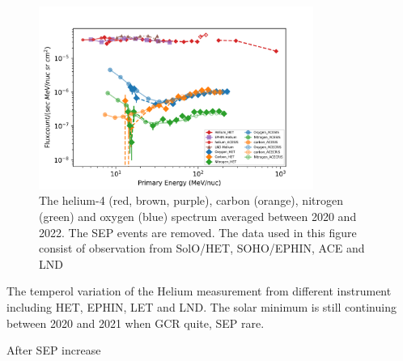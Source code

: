 \begin{figure}
    \centering
    \includegraphics[width = 0.8\textwidth]{images/ACR/ACE_SIS_CRIS_SOLO_all_3.png}
    \caption[The quite time spactra of helium, carbon, nitrogen and oxygen between 2020 and 2022]{The helium-4 (red, brown, purple), carbon (orange), nitrogen (green) and oxygen (blue) spectrum averaged between 2020 and 2022. The \ac{SEP} events are removed. The data used in this figure consist of observation from \ac{SolO}/\ac{HET}, \ac{SOHO}/\ac{EPHIN}, \ac{ACE} and \ac{LND}}
    \label{fig:overview}
\end{figure}




The temperol variation of the Helium measurement from different instrument including HET, EPHIN, LET and LND.
The solar minimum is still continuing between 2020 and 2021 when GCR quite, SEP rare.

After SEP increase


